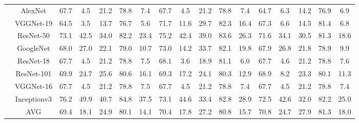 \documentclass[12pt,italian]{article}
\begin{document}
\begin{tiny}
\begin{longtable}{lcccccccccccccccc}
& AlexNet & 67.7 &  4.5 & 21.2 & 78.8 &  7.4 & 67.7 &  4.5 & 21.2 & 78.8 &  7.4 & 64.7 &  6.3 & 14.2 & 76.9 &  6.9 \\ 
& VGGNet-19 & 64.5 &  3.5 & 13.7 & 76.7 &  5.6 & 71.7 & 11.6 & 29.7 & 82.3 & 16.4 & 67.3 &  6.6 & 14.5 & 81.4 &  6.8 \\ 
& ResNet-50 & 73.1 & 42.5 & 34.0 & 82.2 & 23.4 & 75.2 & 42.4 & 39.0 & 83.6 & 26.3 & 71.6 & 34.1 & 30.5 & 81.3 & 18.6 \\ 
& GoogleNet & 68.0 & 27.0 & 22.1 & 79.0 & 10.7 & 73.0 & 14.2 & 33.7 & 82.1 & 19.8 & 67.9 & 26.8 & 21.8 & 78.9 &  9.9 \\ 
& ResNet-18 & 67.7 &  4.5 & 21.2 & 78.8 &  7.5 & 68.1 &  3.6 & 18.9 & 81.1 &  6.0 & 67.7 &  4.6 & 21.2 & 78.8 &  7.6 \\ 
& ResNet-101 & 69.9 & 24.7 & 25.6 & 80.6 & 16.1 & 69.3 & 17.2 & 24.1 & 80.3 & 12.9 & 68.9 &  8.2 & 23.3 & 80.1 & 11.3 \\ 
& VGGNet-16 & 67.7 &  4.5 & 21.2 & 78.8 &  7.5 & 67.7 &  4.5 & 21.2 & 78.8 &  7.4 & 67.7 &  4.5 & 21.2 & 78.8 &  7.4 \\ 
& Inceptionv3 & 76.2 & 49.9 & 40.7 & 84.8 & 37.5 & 73.1 & 44.6 & 33.4 & 82.8 & 28.9 & 72.5 & 42.6 & 32.0 & 82.2 & 25.0 \\ 
\hline
& AVG & 69.4 & 18.1 & 24.9 & 80.1 & 14.1 & 70.4 & 17.8 & 27.2 & 80.8 & 15.7 & 70.8 & 24.7 & 27.9 & 81.3 & 18.0 \\ 
\hline
\bottomrule
\end{longtable} 

 \pagebreak 
\end{tiny} 
 
\end{document}
